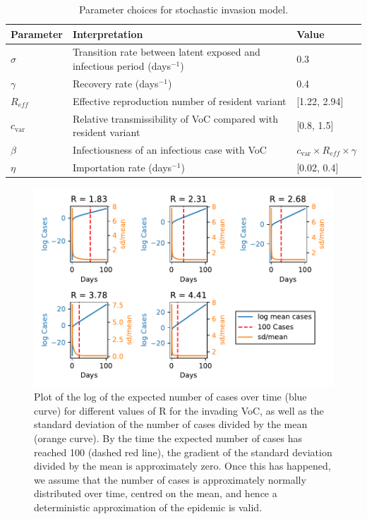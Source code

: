 \documentclass{article}
\begin{document}
\begin{table}[htb] 
\begin{center}
\begin{tabular}{| l | l | l |} \hline
Parameter 	&	Interpretation & Value	\\\hline
$\sigma$	&  Transition rate between latent exposed and infectious period (days$^{-1}$) 	&	0.3 \\\hline
$\gamma$	&	Recovery rate (days$^{-1}$) 	&	0.4\\\hline
$R_{eff}$	& Effective reproduction number of resident variant 	&	[1.22, 2.94] \\\hline
$c_{\text{var}}$	& Relative transmissibility of VoC compared with resident variant 	&  [0.8, 1.5] \\\hline
$\beta$	&	Infectiousness of an infectious case with VoC	&  $c_{\text{var}} \times R_{eff} \times \gamma $\\\hline
$\eta$	&	Importation rate (days$^{-1}$) 	&  [0.02, 0.4] \\\hline
\end{tabular}

\caption{Parameter choices for stochastic invasion model.} 
\label{Table:overall_all} 
\end{center}
\end{table}


\begin{figure}
\centering

\includegraphics[width = \textwidth]{sig_over_mean_comparison.pdf}
\caption{Plot of the log of the expected number of cases over time (blue curve) for different values of R for the invading VoC, as well as the standard deviation of the number of cases divided by the mean (orange curve). By the time the expected number of cases has reached 100 (dashed red line), the gradient of the standard deviation divided by the mean is approximately zero. Once this has happened, we assume that the number of cases is approximately normally distributed over time, centred on the mean, and hence a deterministic approximation of the epidemic is valid. } 
\label{fig: sig_over_mean}
\end{figure}



\end{document}
